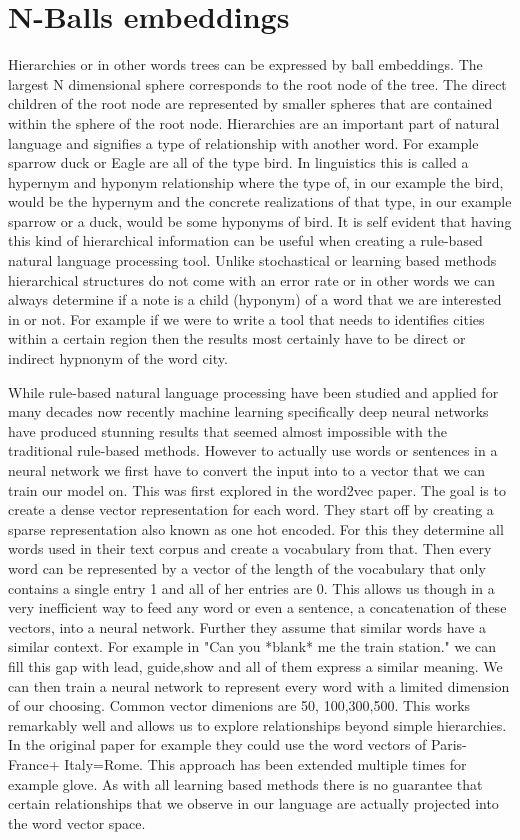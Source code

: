 \documentclass[]{article}
\begin{document}
\section{N-Balls embeddings}
\label{sec::ball}
Hierarchies or in other words trees can be expressed by ball embeddings. The largest N dimensional sphere corresponds to the root node of the tree. The direct children of the root node are represented by smaller spheres that are contained within the sphere of the root node. Hierarchies are an important part of natural language and signifies a type of relationship with another word. For example sparrow duck or Eagle are all of the type bird. In linguistics this is called a hypernym and hyponym relationship where the type of, in our example the bird, would be the hypernym and the concrete realizations of that type, in our example sparrow or a duck, would be some hyponyms of bird. It is self evident that having this kind of hierarchical information can be useful when creating a rule-based natural language processing tool. Unlike stochastical or learning based methods hierarchical structures do not come with an error rate or in other words we can always determine if a note is a child (hyponym) of a word that we are interested in or not. For example if we were to write a tool that needs to identifies cities within a certain region then the results most certainly have to be direct or indirect hypnonym of the word city.
\par
While rule-based natural language processing have been studied and applied for many decades now recently machine learning specifically deep neural networks have produced stunning results that seemed almost impossible with the traditional rule-based methods. However to actually use words or sentences in a neural network we first have to convert the input into to a vector that we can train our model on. This was first explored in the word2vec paper. The goal is to create a dense vector representation for each word. They start off by creating a sparse representation also known as one hot encoded. For this they determine all words used in their text corpus and create a vocabulary from that. Then every word can be represented by a vector of the length of the vocabulary that only contains a single entry 1 and all of her entries are 0. This allows us though in a very inefficient way to feed any word or even a sentence, a concatenation of these vectors, into a neural network. Further they assume that similar words have a similar context. For example in "Can you *blank* me the train station." we can fill this gap with lead, guide,show and all of them express a similar meaning. We can then train a neural network to represent every word with a limited dimension of our choosing. Common vector dimenions are 50, 100,300,500. This works remarkably well and allows us to explore relationships beyond simple hierarchies. In the original paper for example they could use the word vectors of Paris-France+ Italy=Rome. This approach has been extended multiple times for example glove. As with all learning based methods there is no guarantee that certain relationships that we observe in our language are actually projected into the word vector space. 
\end{document}
